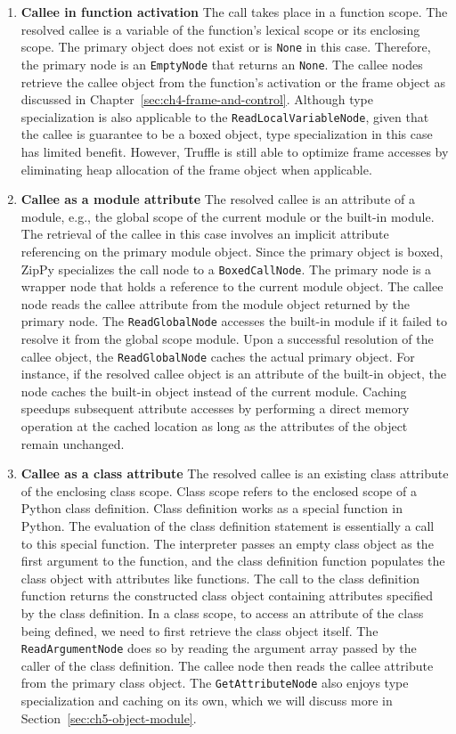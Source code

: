 \begin{enumerate}

\item \textbf{Callee in function activation}
The call takes place in a function scope.
The resolved callee is a variable of the function's lexical scope or its enclosing scope.
The primary object does not exist or is \texttt{None} in this case.
Therefore, the primary node is an \texttt{EmptyNode} that returns an \texttt{None}.
The callee nodes retrieve the callee object from the function's activation or the frame object as discussed in Chapter~\ref{sec:ch4-frame-and-control}.
Although type specialization is also applicable to the \texttt{ReadLocalVariableNode}, given that the callee is guarantee to be a boxed object, type specialization in this case has limited benefit.
However, Truffle is still able to optimize frame accesses by eliminating heap allocation of the frame object when applicable.

\item \textbf{Callee as a module attribute}
The resolved callee is an attribute of a module, e.g., the global scope of the current module or the built-in module.
The retrieval of the callee in this case involves an implicit attribute referencing on the primary module object.
Since the primary object is boxed, ZipPy specializes the call node to a \texttt{BoxedCallNode}.
The primary node is a wrapper node that holds a reference to the current module object.
The callee node reads the callee attribute from the module object returned by the primary node.
The \texttt{ReadGlobalNode} accesses the built-in module if it failed to resolve it from the global scope module.
Upon a successful resolution of the callee object, the \texttt{ReadGlobalNode} caches the actual primary object.
For instance, if the resolved callee object is an attribute of the built-in object, the node caches the built-in object instead of the current module.
Caching speedups subsequent attribute accesses by performing a direct memory operation at the cached location as long as the attributes of the object remain unchanged.

\item \textbf{Callee as a class attribute}
The resolved callee is an existing class attribute of the enclosing class scope.
Class scope refers to the enclosed scope of a Python class definition.
Class definition works as a special function in Python.
The evaluation of the class definition statement is essentially a call to this special function.
The interpreter passes an empty class object as the first argument to the function, and the class definition function populates the class object with attributes like functions.
The call to the class definition function returns the constructed class object containing attributes specified by the class definition.
In a class scope, to access an attribute of the class being defined, we need to first retrieve the class object itself.
The \texttt{ReadArgumentNode} does so by reading the argument array passed by the caller of the class definition.
The callee node then reads the callee attribute from the primary class object.
The \texttt{GetAttributeNode} also enjoys type specialization and caching on its own, which we will discuss more in Section~\ref{sec:ch5-object-module}.


\end{enumerate}
